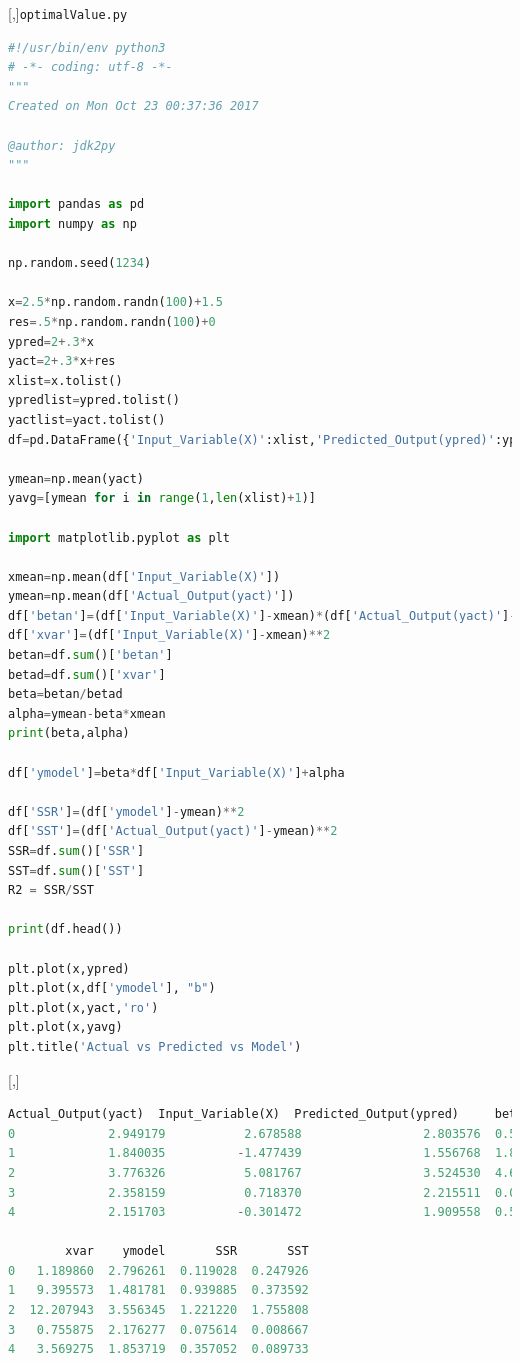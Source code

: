 [,]{\texttt{optimalValue.py}}
\begin{lstlisting}[language=Python]
#!/usr/bin/env python3
# -*- coding: utf-8 -*-
"""
Created on Mon Oct 23 00:37:36 2017

@author: jdk2py
"""

import pandas as pd
import numpy as np

np.random.seed(1234)

x=2.5*np.random.randn(100)+1.5
res=.5*np.random.randn(100)+0
ypred=2+.3*x
yact=2+.3*x+res
xlist=x.tolist()
ypredlist=ypred.tolist()
yactlist=yact.tolist()
df=pd.DataFrame({'Input_Variable(X)':xlist,'Predicted_Output(ypred)':ypredlist,'Actual_Output(yact)':yactlist})

ymean=np.mean(yact)
yavg=[ymean for i in range(1,len(xlist)+1)]

import matplotlib.pyplot as plt

xmean=np.mean(df['Input_Variable(X)'])
ymean=np.mean(df['Actual_Output(yact)'])
df['betan']=(df['Input_Variable(X)']-xmean)*(df['Actual_Output(yact)']-ymean)
df['xvar']=(df['Input_Variable(X)']-xmean)**2
betan=df.sum()['betan']
betad=df.sum()['xvar']
beta=betan/betad
alpha=ymean-beta*xmean
print(beta,alpha)

df['ymodel']=beta*df['Input_Variable(X)']+alpha

df['SSR']=(df['ymodel']-ymean)**2
df['SST']=(df['Actual_Output(yact)']-ymean)**2
SSR=df.sum()['SSR']
SST=df.sum()['SST']
R2 = SSR/SST

print(df.head())

plt.plot(x,ypred)
plt.plot(x,df['ymodel'], "b")
plt.plot(x,yact,'ro')
plt.plot(x,yavg)
plt.title('Actual vs Predicted vs Model')
\end{lstlisting}

[,]{}
\tiny
\begin{lstlisting}[language=Python]
   Actual_Output(yact)  Input_Variable(X)  Predicted_Output(ypred)     betan  \
0             2.949179           2.678588                 2.803576  0.543137
1             1.840035          -1.477439                 1.556768  1.873530
2             3.776326           5.081767                 3.524530  4.629773
3             2.358159           0.718370                 2.215511  0.080941
4             2.151703          -0.301472                 1.909558  0.565934

        xvar    ymodel       SSR       SST
0   1.189860  2.796261  0.119028  0.247926
1   9.395573  1.481781  0.939885  0.373592
2  12.207943  3.556345  1.221220  1.755808
3   0.755875  2.176277  0.075614  0.008667
4   3.569275  1.853719  0.357052  0.089733
\end{lstlisting}


